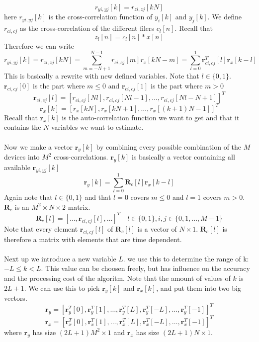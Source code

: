 \documentclass[report, oneside, a4paper, openany]{memoir}
\begin{document}
$$
r_{yi,yj}[k] = r_{zi,zj}[kN]
$$
here $r_{yi,yj}[k]$ is the cross-correlation function of $y_i[k]$ and $y_j[k]$.
We define $r_{ci,cj}$ as the cross-correlation of the different filers $c_l[n]$.
Recall that 
$$
z_l[n] = c_l[n]\ast x[n]
$$
Therefore we can write
$$
r_{yi,yj}[k] = r_{zi,zj}[kN] = \sum_{m=-N+1}^{N-1}r_{ci,cj}[m]r_x[kN-m] = \sum_{l=0}^1\mathbf{r}^T_{ci,cj}[l]\mathbf{r}_x[k-l]
$$
This is basically a rewrite with new defined variables. Note that $l \in \{0,1\}$. $\mathbf{r}_{ci,cj}[0]$ is the part where $m\leq 0$ and $\mathbf{r}_{ci,cj}[1]$ is the part where $m > 0$ 
$$
\mathbf{r}_{ci,cj}[l] = [r_{ci,cj}[Nl], r_{ci,cj}[Nl-1], \dots, r_{ci,cj}[Nl-N+1]]^T
$$
$$
\mathbf{r}_x[k]= [r_x[kN],r_x[kN+1],\dots,r_x[(k+1)N-1]]^T
$$
Recall that $\mathbf{r}_x[k]$ is the auto-correlation function we want to get and that it contains the $N$ variables we want to estimate.\\
\\
Now we make a vector $\mathbf{r}_y[k]$ by combining every possible combination of the $M$ devices into $M^2$ cross-correlations. $\mathbf{r}_y[k]$ is basically a vector containing all available $\mathbf{r}_{yi,yj}[k]$
$$
\mathbf{r}_y[k]=\sum_{l=0}^1\mathbf{R}_c[l]\mathbf{r}_x[k-l]
$$
Again note that $l \in \{0,1\}$ and that $l=0$ covers $m\leq 0$ and $l=1$ covers $m > 0$. $\mathbf{R}_c$ is an $M^2 \times N \times 2$ matrix.
$$
\mathbf{R}_c[l] = [\dots,\mathbf{r}_{ci,cj}[l],\dots]^T \quad l \in \{0,1\}, i,j \in \{0,1, \dots, M-1\}
$$
Note that every element $\mathbf{r}_{ci,cj}[l]$ of $\mathbf{R}_c[l]$ is a vector of $N \times 1$. $\mathbf{R}_c[l]$ is therefore a matrix with elements that are time dependent.\\
\\
Next up we introduce a new variable $L$. we use this to determine the range of k: $-L\leq k<L$. 
This value can be choosen freely, but has influence on the accuracy and the processing cost of the algoritm. 
Note that the amount of values of $k$ is $2L+1$. We can use this to pick $\mathbf{r}_y[k]$ and $\mathbf{r}_x[k]$, and put them into two big vectors.
$$
\mathbf{r}_y = [\mathbf{r}^T_y[0],\mathbf{r}^T_y[1],\dots,\mathbf{r}^T_y[L],\mathbf{r}^T_y[-L],\dots,\mathbf{r}^T_y[-1]]^T
$$
$$
\mathbf{r}_x = [\mathbf{r}^T_x[0],\mathbf{r}^T_x[1],\dots,\mathbf{r}^T_x[L],\mathbf{r}^T_x[-L],\dots,\mathbf{r}^T_x[-1]]^T
$$
where $\mathbf{r}_y$ has size $(2L+1)M^2\times 1$ and $\mathbf{r}_x$ has size $(2L+1)N \times 1$. \\
\end{document}
